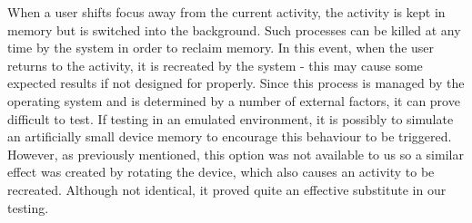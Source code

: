 When a user shifts focus away from the current activity, the activity is kept in memory but is switched into the background.  Such processes can be killed at any time by the system in order to reclaim memory.  In this event, when the user returns to the activity, it is recreated by the system - this may cause some expected results if not designed for properly.  Since this process is managed by the operating system and is determined by a number of external factors, it can prove difficult to test.  If testing in an emulated environment, it is possibly to simulate an artificially small device memory to encourage this behaviour to be triggered.  However, as previously mentioned, this option was not available to us so a similar effect was created by rotating the device, which also causes an activity to be recreated.  Although not identical, it proved quite an effective substitute in our testing.

